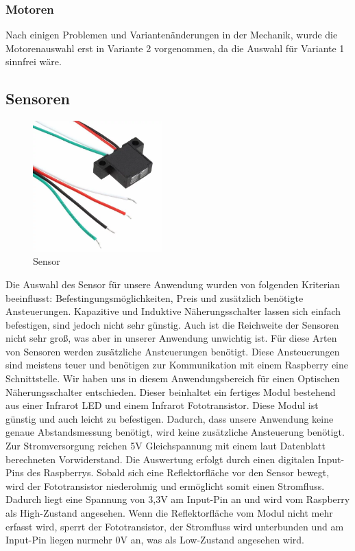 \subsubsection{Motoren}
Nach einigen Problemen und Variantenänderungen in der Mechanik, wurde die Motorenauswahl erst in Variante 2 vorgenommen, da die Auswahl für Variante 1 sinnfrei wäre.

\subsection{Sensoren}
\begin{figure}[H] 
\begin{center}

\includegraphics[width=5cm]{Bilder/Bauteile/Sensor}
\caption{Sensor}
\label{Sensor}

\end{center}
\end{figure}
Die Auswahl des Sensor für unsere Anwendung wurden von folgenden Kriterian beeinflusst: Befestingungsmöglichkeiten, Preis und zusätzlich benötigte Ansteuerungen.
Kapazitive und Induktive Näherungsschalter lassen sich einfach befestigen, sind jedoch nicht sehr günstig. Auch ist die Reichweite der Sensoren nicht sehr groß, was aber in unserer Anwendung unwichtig ist. Für diese Arten von Sensoren werden zusätzliche Ansteuerungen benötigt. Diese Ansteuerungen sind meistens teuer und benötigen zur Kommunikation mit einem Raspberry eine Schnittstelle.
Wir haben uns in diesem Anwendungsbereich für einen Optischen Näherungsschalter entschieden. Dieser beinhaltet ein fertiges Modul bestehend aus einer Infrarot LED und einem Infrarot Fototransistor. Diese Modul ist günstig und auch leicht zu befestigen. Dadurch, dass unsere Anwendung keine genaue Abstandsmessung benötigt, wird keine zusätzliche Ansteuerung benötigt. Zur Stromversorgung reichen 5V Gleichspannung mit einem laut Datenblatt berechneten Vorwiderstand. Die Auswertung erfolgt durch einen digitalen Input-Pins des Raspberrys. Sobald sich eine Reflektorfläche vor den Sensor bewegt, wird der Fototransistor niederohmig und ermöglicht somit einen Stromfluss. Dadurch liegt eine Spannung von 3,3V am Input-Pin an und wird vom Raspberry als High-Zustand angesehen. Wenn die Reflektorfläche vom Modul nicht mehr erfasst wird, sperrt der Fototransistor, der Stromfluss wird unterbunden und am Input-Pin liegen nurmehr 0V an, was als Low-Zustand angesehen wird.

